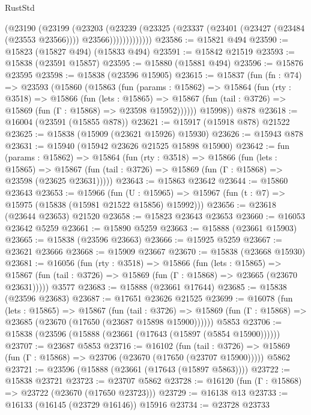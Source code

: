 \begin{lexlean}{RustStd}
\begin{coremodule}
                  (@23190
                    (@23199
                      (@23203
                        (@23239
                          (@23325
                            (@23337 (@23401 (@23427 (@23484 (@23553 @23566)))) @23566)))))))))))))
@23586 := @15821 @494
@23590 := @15823 (@15827 @494) (@15833 @494)
@23591 := @15842 @21519
@23593 := @15838 (@23591 @15857)
@23595 := @15880 (@15881 @494)
@23596 := @15876 @23595
@23598 := @15838 (@23596 @15905)
@23615 := @15837
    (fun (fn : @74) =>
    @23593
      (@15860
        (@15863
          (fun (params : @15862) =>
          @15864
            (fun (rty : @3518) =>
            @15866
              (fun (lets : @15865) =>
              @15867 (fun (tail : @3726) => @15869 (fun (Γ : @15868) => @23598 @15952))))))
        @15998))
    @878
@23618 := @16004 (@23591 (@15855 @878))
@23621 := @15917 (@15918 @878) @21522
@23625 := @15838 (@15909 (@23621 @15926) @15930)
@23626 := @15943 @878
@23631 := @15940 (@15942 @23626 @21525 @15898 @15900)
@23642 := fun (params : @15862) =>
  @15864
    (fun (rty : @3518) =>
    @15866
      (fun (lets : @15865) =>
      @15867 (fun (tail : @3726) => @15869 (fun (Γ : @15868) => @23598 (@23625 @23631)))))
@23643 := @15863 @23642
@23644 := @15860 @23643
@23653 := @15966
    (fun (U : @15965) => @15967 (fun (t : @7) => @15975 (@15838 (@15981 @21522 @15856) @15992)))
@23656 := @23618 (@23644 @23653) @21520
@23658 := @15823 @23643 @23653
@23660 := @16053 @23642 @5259
@23661 := @15890 @5259
@23663 := @15888 (@23661 @15903)
@23665 := @15838 (@23596 @23663)
@23666 := @15925 @5259
@23667 := @23621 @23666
@23668 := @15909 @23667
@23670 := @15838 (@23668 @15930)
@23681 := @16056
    (fun (rty : @3518) =>
    @15866
      (fun (lets : @15865) =>
      @15867 (fun (tail : @3726) => @15869 (fun (Γ : @15868) => @23665 (@23670 @23631)))))
    @3577
@23683 := @15888 (@23661 @17644)
@23685 := @15838 (@23596 @23683)
@23687 := @17651 @23626 @21525
@23699 := @16078
    (fun (lets : @15865) =>
    @15867
      (fun (tail : @3726) =>
      @15869 (fun (Γ : @15868) => @23685 (@23670 (@17650 (@23687 @15898 @15900))))))
    @5853
@23706 := @15838 (@23596 (@15888 (@23661 (@17643 (@15897 (@5854 @15900))))))
@23707 := @23687 @5853
@23716 := @16102
    (fun (tail : @3726) => @15869 (fun (Γ : @15868) => @23706 (@23670 (@17650 (@23707 @15900)))))
    @5862
@23721 := @23596 (@15888 (@23661 (@17643 (@15897 @5863))))
@23722 := @15838 @23721
@23723 := @23707 @5862
@23728 := @16120 (fun (Γ : @15868) => @23722 (@23670 (@17650 @23723)))
@23729 := @16138 @13
@23733 := @16133 (@16145 (@23729 @16146)) @15916
@23734 := @23728 @23733

\end{coremodule}
\end{lexlean}
